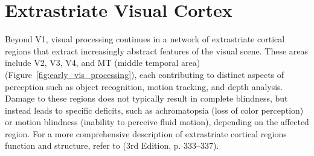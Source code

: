 \section{Extrastriate Visual Cortex}
\label{sec:extrastriate}

Beyond V1, visual processing continues in a network of extrastriate cortical regions that extract increasingly abstract features of the visual scene. These areas include V2, V3, V4, and MT (middle temporal area) (Figure~\ref{fig:early_vis_processing}), each contributing to distinct aspects of perception such as object recognition, motion tracking, and depth analysis. Damage to these regions does not typically result in complete blindness, but instead leads to specific deficits, such as achromatopsia (loss of color perception) or motion blindness (inability to perceive fluid motion), depending on the affected region. For a more comprehensive description of extrastriate cortical regions function and structure, refer to \citet{bear2020neuroscience} (3rd Edition, p. 333--337).